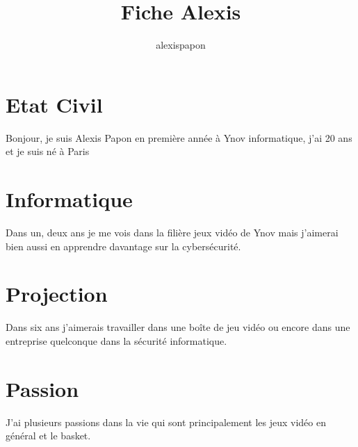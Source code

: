\documentclass{article}
\title{Fiche Alexis}
\author{alexispapon }
\begin{document}
\maketitle

\section{Etat Civil}
Bonjour, je suis Alexis Papon en première année à Ynov informatique, j'ai 20 ans et je suis né à Paris

\section{Informatique}
Dans un, deux ans je me vois dans la filière jeux vidéo de Ynov mais j'aimerai bien aussi en apprendre davantage sur la cybersécurité.
\section{Projection}
Dans six ans j'aimerais travailler dans une boîte de jeu vidéo ou encore dans une entreprise quelconque dans la sécurité informatique.
\section{Passion}
J'ai plusieurs passions dans la vie qui sont principalement les jeux vidéo en général et le basket.
\end{document}
